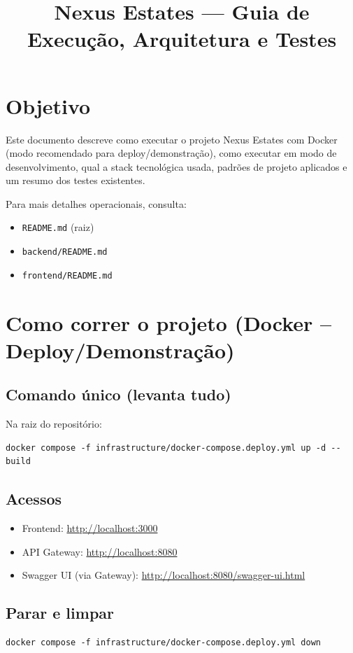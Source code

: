 \documentclass[11pt,a4paper]{article}
\title{Nexus Estates — Guia de Execução, Arquitetura e Testes}
\author{}
\date{}
\begin{document}
\maketitle

\section{Objetivo}
Este documento descreve como executar o projeto Nexus Estates com Docker (modo recomendado para deploy/demonstração), como executar em modo de desenvolvimento, qual a stack tecnológica usada, padrões de projeto aplicados e um resumo dos testes existentes.

Para mais detalhes operacionais, consulta:
\begin{itemize}[nosep]
  \item \texttt{README.md} (raiz)
  \item \texttt{backend/README.md}
  \item \texttt{frontend/README.md}
\end{itemize}

\section{Como correr o projeto (Docker -- Deploy/Demonstração)}
\subsection{Comando único (levanta tudo)}
Na raiz do repositório:
\begin{verbatim}
docker compose -f infrastructure/docker-compose.deploy.yml up -d --build
\end{verbatim}

\subsection{Acessos}
\begin{itemize}[nosep]
  \item Frontend: \url{http://localhost:3000}
  \item API Gateway: \url{http://localhost:8080}
  \item Swagger UI (via Gateway): \url{http://localhost:8080/swagger-ui.html}
\end{itemize}

\subsection{Parar e limpar}
\begin{verbatim}
docker compose -f infrastructure/docker-compose.deploy.yml down
\end{verbatim}
\end{document}
